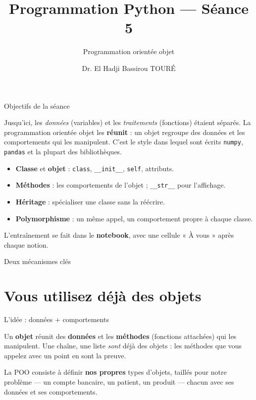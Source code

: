 \documentclass[aspectratio=169,11pt]{beamer}
\title{Programmation Python — Séance 5}
\subtitle{Programmation orientée objet}
\author{Dr. El Hadji Bassirou TOURÉ}
\institute{Département de Mathématiques et Informatique\\ Faculté des Sciences et Techniques\\ Université Cheikh Anta Diop de Dakar}
\date{}
\begin{document}
\begin{frame}\titlepage\end{frame}

\begin{frame}{Objectifs de la séance}
\begin{ucaddef}[Contenu]
{\small Jusqu'ici, les \emph{données} (variables) et les \emph{traitements} (fonctions) étaient séparés. La programmation orientée objet les \textbf{réunit} : un objet regroupe des données et les comportements qui les manipulent. C'est le style dans lequel sont écrits \texttt{numpy}, \texttt{pandas} et la plupart des bibliothèques.}
\end{ucaddef}
\begin{itemize}\small
  \item \textbf{Classe} et \textbf{objet} : \texttt{class}, \texttt{\_\_init\_\_}, \texttt{self}, attributs.
  \item \textbf{Méthodes} : les comportements de l'objet ; \texttt{\_\_str\_\_} pour l'affichage.
  \item \textbf{Héritage} : spécialiser une classe sans la réécrire.
  \item \textbf{Polymorphisme} : un même appel, un comportement propre à chaque classe.
\end{itemize}
{\small L'entraînement se fait dans le \textbf{notebook}, avec une cellule « À vous » après chaque notion.}
\end{frame}

\begin{frame}{Deux mécanismes clés}
\end{frame}

\section{Vous utilisez déjà des objets}

\begin{frame}{L'idée : données + comportements}
\begin{ucaddef}
{\small Un \textbf{objet} réunit des \textbf{données} et les \textbf{méthodes} (fonctions attachées) qui les manipulent. Une chaîne, une liste \emph{sont} déjà des objets : les méthodes que vous appelez avec un point en sont la preuve.}
\end{ucaddef}
{\small La POO consiste à définir \textbf{nos propres} types d'objets, taillés pour notre problème — un compte bancaire, un patient, un produit — chacun avec ses données et ses comportements.}
\end{frame}
\end{document}
